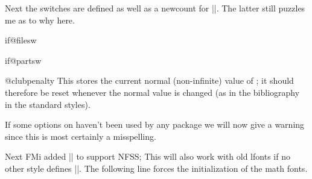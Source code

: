 Next the switches are defined as well as a newcount for |\@clubpenalty|.
The latter still puzzles me as to why here.

 \begin{docCmd}{if@filesw}{}
 \begin{docCmd}{if@partsw}{}
 \end{docCmd}
 \end{docCmd}
    \begin{teX}
\newif\if@filesw \@fileswtrue
\newif\if@partsw \@partswfalse
    \end{teX}

 \begin{docCmd}{@clubpenalty}{}
    This stores the current normal (non-infinite) value of
    ; it should therefore be reset whenever the
    normal value is changed (as in the bibliography in the standard
    styles).
  \end{docCmd}
    \begin{teX}
\newcount\@clubpenalty
\@clubpenalty \clubpenalty
    \end{teX}


  \begin{teX}
    \def\document{\endgroup
   \end{teX}

    If some options on  haven't been used by any
    package we will now give a warning since this is most certainly a
    misspelling.



Next 
 FMi added |\process@table| to support NFSS;
 This will also work with old lfonts if no other style defines
 |\process@table|.  The following line forces the initialization of
 the math fonts.
 \begin{teX}
  \process@table
  \let\glb@currsize\@empty  %
  \normalsize
  \everypar{}%
 \end{teX}
%

